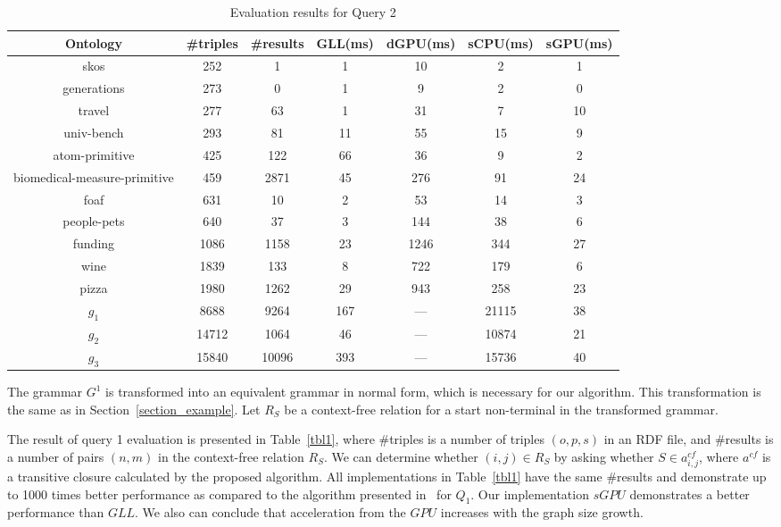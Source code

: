 \begin{table*}[h]
\centering
\caption{Evaluation results for Query 2}
\label{tbl2}

\begin{tabular}{ | c | c | c | c | c | c | c |}
\hline
Ontology & \#triples & \#results & GLL(ms) & dGPU(ms) & sCPU(ms) & sGPU(ms) \\
\hline 
\hline
skos        & 252 & 1 & 1 & 10 & 2 & 1\\
generations & 273 & 0 & 1 & 9 & 2 & 0\\
travel      & 277 & 63 & 1 & 31 & 7 & 10\\
univ-bench  & 293 & 81 & 11 & 55 & 15 & 9\\
atom-primitive & 425 & 122 & 66 & 36 & 9 & 2\\
biomedical-measure-primitive & 459 & 2871 & 45 & 276 & 91 & 24\\
foaf        & 631 & 10 & 2 & 53 & 14 & 3\\
people-pets & 640 & 37 & 3 & 144 & 38 & 6\\
funding     & 1086 & 1158 & 23 & 1246 & 344 & 27\\
wine        & 1839 & 133 & 8 & 722 & 179 & 6\\
pizza       & 1980 & 1262 & 29 & 943 & 258 & 23\\
$g_{1}$     & 8688 & 9264 & 167 & --- & 21115 & 38\\
$g_{2}$     & 14712 & 1064 & 46 & --- & 10874 & 21\\
$g_{3}$     & 15840 & 10096 & 393 & --- & 15736 & 40\\
\hline
\end{tabular}

\end{table*}


The grammar $G^1$ is transformed into an equivalent grammar in normal form, which is necessary for our algorithm. This transformation is the same as in Section~\ref{section_example}. Let $R_S$ be a context-free relation for a start non-terminal in the transformed grammar.

The result of query 1 evaluation is presented in Table~\ref{tbl1}, where \#triples is a number of triples $(o,p,s)$ in an RDF file, and \#results is a number of pairs $(n,m)$ in the context-free relation $R_S$. We can determine whether $(i,j) \in R_S$ by asking whether $S \in a^{cf}_{i,j}$, where $a^{cf}$ is a transitive closure calculated by the proposed algorithm. All implementations in Table~\ref{tbl1} have the same \#results and demonstrate up to 1000 times better performance as compared to the algorithm presented in~\cite{RDF} for $Q_1$. Our implementation $sGPU$ demonstrates a better performance than $GLL$. We also can conclude that acceleration from the $GPU$ increases with the graph size growth.

